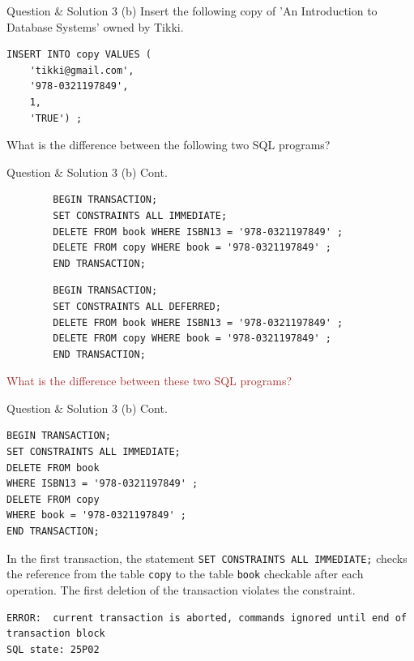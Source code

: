 \begin{frame}[fragile]{Question \& Solution 3 (b)}
Insert the following copy of 'An Introduction to Database Systems' owned by Tikki. \vspace{10pt}

\begin{lstlisting}
INSERT INTO copy VALUES (
	'tikki@gmail.com', 
	'978-0321197849', 
	1, 
	'TRUE') ;
\end{lstlisting}

What is the difference between the following two SQL programs?
\end{frame}


\begin{frame}[fragile]{Question \& Solution 3 (b) Cont.}
	\begin{lstlisting}
		BEGIN TRANSACTION;
		SET CONSTRAINTS ALL IMMEDIATE;
		DELETE FROM book WHERE ISBN13 = '978-0321197849' ;
		DELETE FROM copy WHERE book = '978-0321197849' ;
		END TRANSACTION;
	\end{lstlisting}
	
	\begin{lstlisting}
		BEGIN TRANSACTION;
		SET CONSTRAINTS ALL DEFERRED;
		DELETE FROM book WHERE ISBN13 = '978-0321197849' ;
		DELETE FROM copy WHERE book = '978-0321197849' ;
		END TRANSACTION;
	\end{lstlisting}
\textcolor{brown}{What is the difference between these two SQL programs?}
\end{frame}


\begin{frame}[fragile]{Question \& Solution 3 (b) Cont.}
\begin{lstlisting}
BEGIN TRANSACTION;
SET CONSTRAINTS ALL IMMEDIATE;
DELETE FROM book 
WHERE ISBN13 = '978-0321197849' ;
DELETE FROM copy 
WHERE book = '978-0321197849' ;
END TRANSACTION;
\end{lstlisting}

In the first transaction, the statement \texttt{SET CONSTRAINTS ALL IMMEDIATE;} checks the reference from the table \texttt{copy} to the table \texttt{book} checkable after each operation. The first deletion of the transaction violates the constraint.

\begin{lstlisting}[style=error]
ERROR:  current transaction is aborted, commands ignored until end of transaction block
SQL state: 25P02
\end{lstlisting}

\end{frame}


